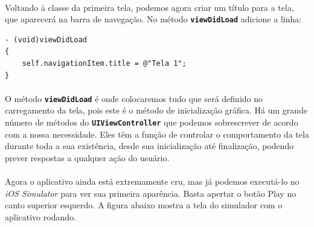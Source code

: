 \documentclass[a4paper,12pt,brazil,doubleside]{book}
\begin{document}
\paragraph{}Voltando à classe da primeira tela, podemos agora criar um título para a tela, que aparecerá na barra de navegação. No método \texttt{\textbf{viewDidLoad}} adicione a linha:

\begin{listing}
\begin{verbatim}
- (void)viewDidLoad
{
	self.navigationItem.title = @"Tela 1";
}
\end{verbatim}
\end{listing}

\paragraph{}O método \texttt{\textbf{viewDidLoad}} é onde colocaremos tudo que será definido no carregamento da tela, pois este é o método de inicialização gráfica. Há um grande número de métodos do \texttt{\textbf{UIViewController}} que podemos sobrescrever de acordo com a nossa necessidade. Eles têm a função de controlar o comportamento da tela durante toda a sua existência, desde sua inicialização até finalização, podendo prever respostas a qualquer ação do usuário.
\paragraph{}Agora o aplicativo ainda está extremamente cru, mas já podemos executá-lo no \emph{iOS Simulator} para ver sua primeira aparência. Basta apertar o botão Play no canto superior esquerdo. A figura abaixo mostra a tela do simulador com o aplicativo rodando.
\end{document}
